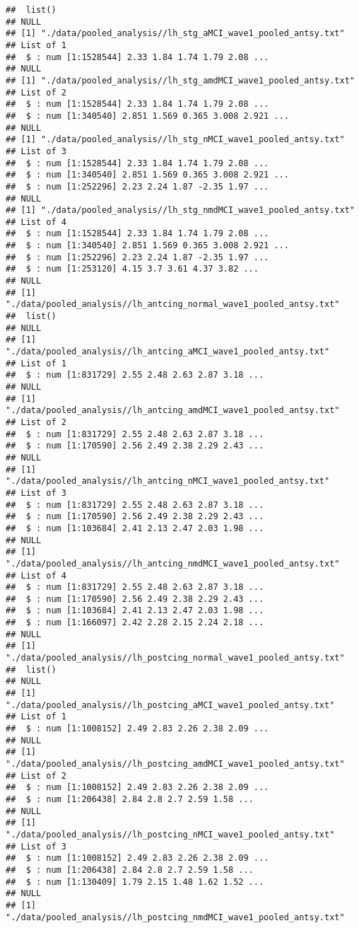 \documentclass[12pt]{article}\usepackage[]{graphicx}\usepackage[]{color}
\makeatletter
\newenvironment{kframe}{%
 \def\at@end@of@kframe{}%
 \ifinner\ifhmode%
  \def\at@end@of@kframe{\end{minipage}}%
  \begin{minipage}{\columnwidth}%
 \fi\fi%
 \def\FrameCommand##1{\hskip\@totalleftmargin \hskip-\fboxsep
 \colorbox{shadecolor}{##1}\hskip-\fboxsep
     \hskip-\linewidth \hskip-\@totalleftmargin \hskip\columnwidth}%
 \MakeFramed {\advance\hsize-\width
   \@totalleftmargin\z@ \linewidth\hsize
   \@setminipage}}%
 {\par\unskip\endMakeFramed%
 \at@end@of@kframe}
\newenvironment{knitrout}{}{} %
\makeatother
\begin{document}
\begin{knitrout}
\begin{kframe}
\begin{verbatim}
##  list()
## NULL
## [1] "./data/pooled_analysis//lh_stg_aMCI_wave1_pooled_antsy.txt"
## List of 1
##  $ : num [1:1528544] 2.33 1.84 1.74 1.79 2.08 ...
## NULL
## [1] "./data/pooled_analysis//lh_stg_amdMCI_wave1_pooled_antsy.txt"
## List of 2
##  $ : num [1:1528544] 2.33 1.84 1.74 1.79 2.08 ...
##  $ : num [1:340540] 2.851 1.569 0.365 3.008 2.921 ...
## NULL
## [1] "./data/pooled_analysis//lh_stg_nMCI_wave1_pooled_antsy.txt"
## List of 3
##  $ : num [1:1528544] 2.33 1.84 1.74 1.79 2.08 ...
##  $ : num [1:340540] 2.851 1.569 0.365 3.008 2.921 ...
##  $ : num [1:252296] 2.23 2.24 1.87 -2.35 1.97 ...
## NULL
## [1] "./data/pooled_analysis//lh_stg_nmdMCI_wave1_pooled_antsy.txt"
## List of 4
##  $ : num [1:1528544] 2.33 1.84 1.74 1.79 2.08 ...
##  $ : num [1:340540] 2.851 1.569 0.365 3.008 2.921 ...
##  $ : num [1:252296] 2.23 2.24 1.87 -2.35 1.97 ...
##  $ : num [1:253120] 4.15 3.7 3.61 4.37 3.82 ...
## NULL
## [1] "./data/pooled_analysis//lh_antcing_normal_wave1_pooled_antsy.txt"
##  list()
## NULL
## [1] "./data/pooled_analysis//lh_antcing_aMCI_wave1_pooled_antsy.txt"
## List of 1
##  $ : num [1:831729] 2.55 2.48 2.63 2.87 3.18 ...
## NULL
## [1] "./data/pooled_analysis//lh_antcing_amdMCI_wave1_pooled_antsy.txt"
## List of 2
##  $ : num [1:831729] 2.55 2.48 2.63 2.87 3.18 ...
##  $ : num [1:170590] 2.56 2.49 2.38 2.29 2.43 ...
## NULL
## [1] "./data/pooled_analysis//lh_antcing_nMCI_wave1_pooled_antsy.txt"
## List of 3
##  $ : num [1:831729] 2.55 2.48 2.63 2.87 3.18 ...
##  $ : num [1:170590] 2.56 2.49 2.38 2.29 2.43 ...
##  $ : num [1:103684] 2.41 2.13 2.47 2.03 1.98 ...
## NULL
## [1] "./data/pooled_analysis//lh_antcing_nmdMCI_wave1_pooled_antsy.txt"
## List of 4
##  $ : num [1:831729] 2.55 2.48 2.63 2.87 3.18 ...
##  $ : num [1:170590] 2.56 2.49 2.38 2.29 2.43 ...
##  $ : num [1:103684] 2.41 2.13 2.47 2.03 1.98 ...
##  $ : num [1:166097] 2.42 2.28 2.15 2.24 2.18 ...
## NULL
## [1] "./data/pooled_analysis//lh_postcing_normal_wave1_pooled_antsy.txt"
##  list()
## NULL
## [1] "./data/pooled_analysis//lh_postcing_aMCI_wave1_pooled_antsy.txt"
## List of 1
##  $ : num [1:1008152] 2.49 2.83 2.26 2.38 2.09 ...
## NULL
## [1] "./data/pooled_analysis//lh_postcing_amdMCI_wave1_pooled_antsy.txt"
## List of 2
##  $ : num [1:1008152] 2.49 2.83 2.26 2.38 2.09 ...
##  $ : num [1:206438] 2.84 2.8 2.7 2.59 1.58 ...
## NULL
## [1] "./data/pooled_analysis//lh_postcing_nMCI_wave1_pooled_antsy.txt"
## List of 3
##  $ : num [1:1008152] 2.49 2.83 2.26 2.38 2.09 ...
##  $ : num [1:206438] 2.84 2.8 2.7 2.59 1.58 ...
##  $ : num [1:130409] 1.79 2.15 1.48 1.62 1.52 ...
## NULL
## [1] "./data/pooled_analysis//lh_postcing_nmdMCI_wave1_pooled_antsy.txt"

\end{verbatim}
\end{kframe}
\end{knitrout}
\end{document}
